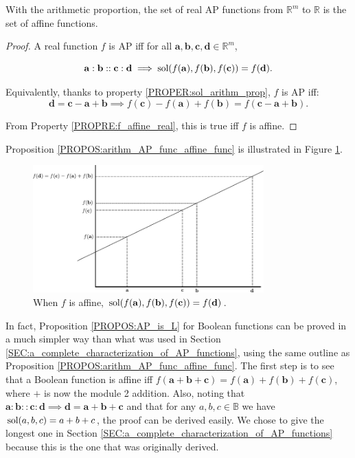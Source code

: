 \begin{proposition}
  \label{PROPOS:arithm_AP_func_affine_func}
  With the arithmetic proportion, the set of real AP functions from
  $\mathbb{R}^m$ to $\mathbb{R}$ is the set of affine functions.
\end{proposition}
\begin{proof}
  A real function $f$ is AP iff for all $\mathbf{a}, \mathbf{b}, \mathbf{c},
  \mathbf{d} \in \mathbb{R}^m$,

  $$\mathbf{a}: \mathbf{b}:: \mathbf{c}: \mathbf{d} \implies
  \text{sol}(f(\mathbf{a}), f(\mathbf{b}), f(\mathbf{c})) = f(\mathbf{d}).$$

  Equivalently, thanks to property \ref{PROPER:sol_arithm_prop},  $f$ is AP
  iff: $$\mathbf{d} = \mathbf{c} - \mathbf{a} + \mathbf{b} \implies
  f(\mathbf{c}) - f(\mathbf{a}) +  f(\mathbf{b}) = f( \mathbf{c} - \mathbf{a} +
  \mathbf{b}).$$

  From Property \ref{PROPRE:f_affine_real}, this is true iff $f$ is affine.
\end{proof}

Proposition \ref{PROPOS:arithm_AP_func_affine_func} is illustrated in Figure
\ref{FIG:real_AP_func}.
\begin{figure}[!h]
\centering
  \includegraphics[width=3.5in]{figures/real_AP_fuction.pdf}
  \caption{When $f$ is affine, $\text{sol}(f(\mathbf{a}), f(\mathbf{b}),
  f(\mathbf{c})) = f(\mathbf{d})$.}
\label{FIG:real_AP_func}
\end{figure}

In fact, Proposition \ref{PROPOS:AP_is_L} for Boolean functions can be
proved in a much simpler way than what was used in Section
\ref{SEC:a_complete_characterization_of_AP_functions}, using
the same outline as Proposition \ref{PROPOS:arithm_AP_func_affine_func}. The
first step is to see that a Boolean function is affine iff $f(\mathbf{a} +
\mathbf{b} + \mathbf{c}) = f(\mathbf{a}) + f(\mathbf{b}) + f(\mathbf{c})$,
where $+$ is now the module 2 addition. Also, noting that $\mathbf{a} :
\mathbf{b} :: \mathbf{c} : \mathbf{d} \implies \mathbf{d} = \mathbf{a} +
\mathbf{b} + \mathbf{c}$ and that for any $a, b, c \in \mathbb{B}$ we have
$\text{sol}(a, b, c) = a + b + c$, the proof can be derived easily. We chose to give
the longest one in Section \ref{SEC:a_complete_characterization_of_AP_functions} because this is the one that was
originally derived.

